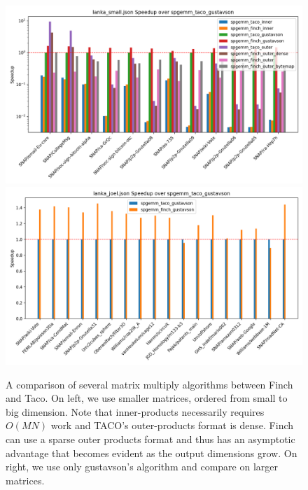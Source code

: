 \begin{figure}
	\includegraphics[width=0.5\linewidth]{spgemm_small_speedup_log_scale.png}%
	\includegraphics[width=0.5\linewidth]{spgemm_joel_speedup.png}
    \vspace{-8pt}
    \caption{A comparison of several matrix multiply algorithms between
    Finch and Taco. On left, we use smaller matrices, ordered from small to big
    dimension. Note that inner-products necessarily requires $O(MN)$ work and
    TACO's outer-products format is dense. Finch can use a sparse outer products
    format and thus has an asymptotic advantage that becomes evident as the
    output dimensions grow. On right, we use only gustavson's algorithm and
    compare on larger matrices.}
    \label{fig:spgemm}
    \vspace{-12pt}
\end{figure}